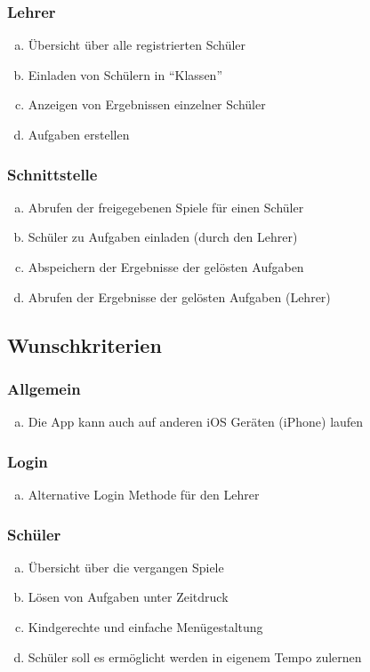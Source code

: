 \subsubsection{Lehrer}
\begin{enumerate}[a)]
\item Übersicht über alle registrierten Schüler
\item Einladen von Schülern in “Klassen”
\item Anzeigen von Ergebnissen einzelner Schüler
\item Aufgaben erstellen
\end{enumerate}


\subsubsection{Schnittstelle}
\begin{enumerate}[a)]
\item Abrufen der freigegebenen Spiele für einen Schüler
\item Schüler zu Aufgaben einladen (durch den Lehrer)
\item Abspeichern der Ergebnisse der gelösten Aufgaben
\item Abrufen der Ergebnisse der gelösten Aufgaben (Lehrer)
\end{enumerate}


\subsection{Wunschkriterien}
\subsubsection{Allgemein}
\begin{enumerate}[a)]
\item Die App kann auch auf anderen iOS Geräten (iPhone) laufen
\end{enumerate}

\subsubsection{Login}
\begin{enumerate}[a)]
\item Alternative Login Methode für den Lehrer
\end{enumerate}

\subsubsection{Schüler}
\begin{enumerate}[a)]
\item Übersicht über die vergangen Spiele
\item Lösen von Aufgaben unter Zeitdruck
\item Kindgerechte und einfache Menügestaltung
\item Schüler soll es ermöglicht werden in eigenem Tempo zulernen
\end{enumerate}

